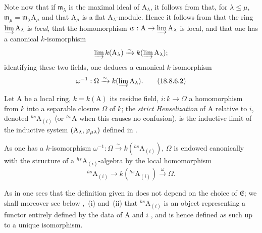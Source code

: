 \begin{env}[18.8.6]
Note now that if $\mathfrak{m}_\lambda$ is the maximal ideal of $\mathrm{A}_\lambda$, it follows from  that, for $\lambda\leq\mu$, $\mathfrak{m}_\mu=\mathfrak{m}_\lambda\mathrm{A}_\mu$ and that $\mathrm{A}_\mu$ is a flat $\mathrm{A}_\lambda$-module.
Hence it follows from  that the ring $\varinjlim\mathrm{A}_\lambda$ is \emph{local}, that the homomorphism $w:\mathrm{A}\to\varinjlim\mathrm{A}_\lambda$ is local, and that one has a canonical $k$-isomorphism
\[
  \varinjlim k(\mathrm{A}_\lambda)\xrightarrow{\sim}k(\varinjlim\mathrm{A}_\lambda);
\]
identifying these two fields, one deduces a canonical $k$-isomorphism
\begin{equation}
  \omega^{-1}:\Omega\xrightarrow{\sim}k(\varinjlim\mathrm{A}_\lambda).
  \label{IV.18.8.6.2}
\tag{18.8.6.2}
\end{equation}
\end{env}

\begin{definition}[18.8.7]
\label{IV.18.8.7}
Let $\mathrm{A}$ be a local ring, $k=k(\mathrm{A})$ its residue field, $i:k\to\Omega$ a homomorphism from $k$ into a separable closure $\Omega$ of $k$;
the \emph{strict Henselization} of $\mathrm{A}$ relative to $i$, denoted ${}^{hs}\!\mathrm{A}_{(i)}$ (or ${}^{hs}\!\mathrm{A}$ when this causes no confusion), is the inductive limit of the inductive system $(\mathrm{A}_\lambda,\varphi_{\mu\lambda})$ defined in .
\end{definition}

As one has a $k$-isomorphism $\omega^{-1}:\Omega\xrightarrow{\sim}k({}^{hs}\!\mathrm{A}_{(i)})$, $\Omega$ is endowed canonically with the structure of a ${}^{hs}\!\mathrm{A}_{(i)}$-algebra by the local homomorphism
\[
  {}^{hs}\!\mathrm{A}_{(i)}\to k({}^{hs}\!\mathrm{A}_{(i)})\xrightarrow{\omega}\Omega.
\]

As in  one sees that the definition given in  does not depend on the choice of $\mathfrak{E}$;
we shall moreover see below ,~(i) and~(ii) that ${}^{hs}\!\mathrm{A}_{(i)}$ is an object representing a functor entirely defined by the data of A and $i$ , and is hence defined as such up to a unique isomorphism.

